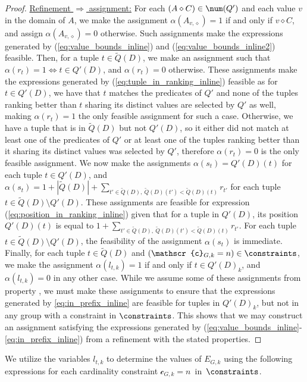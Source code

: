 \begin{proof}
    \indent \underline{Refinement $\Longrightarrow$ assignment:} For each $(A \diamond C) \in \num(Q')$ and each value $v$ in the domain of $A$, we make the assignment $\alpha(A_{v, \diamond}) = 1$ if and only if $v \diamond C$, and assign $\alpha(A_{v, \diamond}) = 0$ otherwise. Such assignments make the expressions generated by (\ref{eq:value_bounds_inline}) and (\ref{eq:value_bounds_inline2}) feasible. Then, for a tuple $t \in \widetilde{Q}(D)$, we make an assignment such that $\alpha(r_t) = 1 \iff t \in Q'(D)$, and $\alpha(r_t) = 0$ otherwise. These assignments make the expressions generated by (\ref{eq:tuple_in_ranking_inline}) feasible as for $t \in Q'(D)$, we have that $t$ matches the predicates of $Q'$ and none of the tuples ranking better than $t$ sharing its distinct values are selected by $Q'$ as well, making $\alpha(r_t) = 1$ the only feasible assignment for such a case. Otherwise, we have a tuple that is in $\widetilde{Q}(D)$ but not $Q'(D)$, so it either did not match at least one of the predicates of $Q'$ or at least one of the tuples ranking better than it sharing its distinct values was selected by $Q'$, therefore $\alpha(r_t) = 0$ is the only feasible assignment. We now make the assignments $\alpha(s_t) = Q'(D)(t)$ for each tuple $t \in Q'(D)$, and $\alpha(s_t) = 1 + |\widetilde{Q}(D)| + \sum_{t' \in \widetilde{Q}(D),~\widetilde{Q}(D)(t') < \widetilde{Q}(D)(t)} r_{t'}$ for each tuple $t \in \widetilde{Q}(D) \setminus Q'(D)$. These assignments are feasible for expression (\ref{eq:position_in_ranking_inline}) given that for a tuple in $Q'(D)$, its position $Q'(D)(t)$ is equal to $1 + \sum_{t' \in \widetilde{Q}(D),~\widetilde{Q}(D)(t') < \widetilde{Q}(D)(t)} r_{t'}$. For each tuple $t \in \widetilde{Q}(D) \setminus Q'(D)$, the feasibility of the assignment $\alpha(s_t)$ is immediate. Finally, for each tuple $t \in \widetilde{Q}(D)$ and $(\mathscr{c}_{G, k} = n) \in \constraints$, we make the assignment $\alpha(l_{t, k}) = 1$ if and only if $t \in Q'(D)_k$, and $\alpha(l_{t, k}) = 0$ in any other case. While we assume some of these assignments from property , we must make these assignments to ensure that the expressions generated by \ref{eq:in_prefix_inline} are feasible for tuples in $Q'(D)_k$, but not in any group with a constraint in $\constraints$. This shows that we may construct an assignment satisfying the expressions generated by (\ref{eq:value_bounds_inline}-\ref{eq:in_prefix_inline}) from a refinement with the stated properties.
\end{proof}
\fi
We utilize the variables $l_{t, k}$ to determine the values of $E_{G, k}$ using the following expressions for each cardinality constraint $\mathscr{c}_{G, k} = n$~in~$\constraints$.
